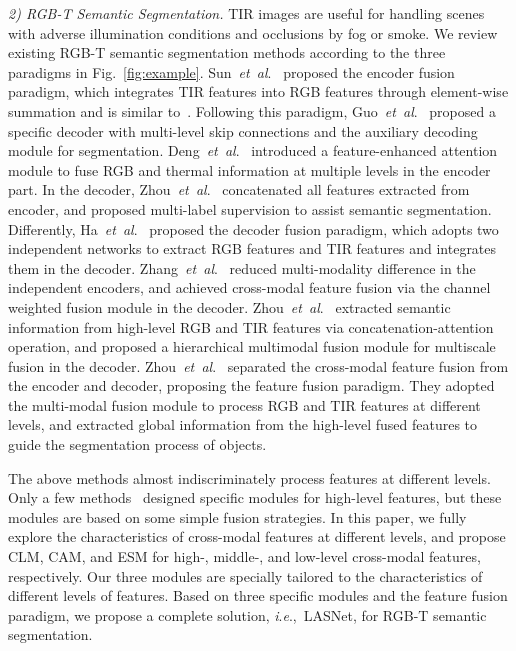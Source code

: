 \documentclass[journal]{IEEEtran}
\newcommand{\etal}{\textit{et~al}.~}
\newcommand{\ie}{\textit{i}.\textit{e}.,~}
\begin{document}
\textit{2) RGB-T Semantic Segmentation.}
TIR images are useful for handling scenes with adverse illumination conditions and occlusions by fog or smoke.
We review existing RGB-T semantic segmentation methods according to the three paradigms in Fig.~\ref{fig:example}.
Sun~\etal\cite{2019RTFNet,2021FuseSeg} proposed the encoder fusion paradigm, which integrates TIR features into RGB features through element-wise summation and is similar to~\cite{2016FuseNet}.
Following this paradigm, Guo~\etal\cite{2021MLFNet} proposed a specific decoder with multi-level skip connections and the auxiliary decoding module for segmentation.
Deng~\etal\cite{2021FEANet} introduced a feature-enhanced attention module to fuse RGB and thermal information at multiple levels in the encoder part.
In the decoder, Zhou~\etal\cite{2022MFFENet} concatenated all features extracted from encoder, and proposed multi-label supervision to assist semantic segmentation.
Differently, Ha~\etal\cite{2017MFNet} proposed the decoder fusion paradigm, which adopts two independent networks to extract RGB features and TIR features and integrates them in the decoder.
Zhang~\etal\cite{2021ABMDRNet} reduced multi-modality difference in the independent encoders, and achieved cross-modal feature fusion via the channel weighted fusion module in the decoder.
Zhou~\etal\cite{2022MTANet} extracted semantic information from high-level RGB and TIR features via concatenation-attention operation, and proposed a hierarchical multimodal fusion module for multiscale fusion in the decoder.
Zhou~\etal\cite{2021GMNet,2022GCNet,2022EGFNet} separated the cross-modal feature fusion from the encoder and decoder, proposing the feature fusion paradigm.
They adopted the multi-modal fusion module to process RGB and TIR features at different levels, and extracted global information from the high-level fused features to guide the segmentation process of objects.


The above methods almost indiscriminately process features at different levels.
Only a few methods~\cite{2021GMNet,2022MTANet,2022GCNet,2022EGFNet} designed specific modules for high-level features, but these modules are based on some simple fusion strategies.
In this paper, we fully explore the characteristics of cross-modal features at different levels, and propose CLM, CAM, and ESM for high-, middle-, and low-level cross-modal features, respectively.
Our three modules are specially tailored to the characteristics of different levels of features.
Based on three specific modules and the feature fusion paradigm, we propose a complete solution, \ie LASNet, for RGB-T semantic segmentation.
\end{document}
